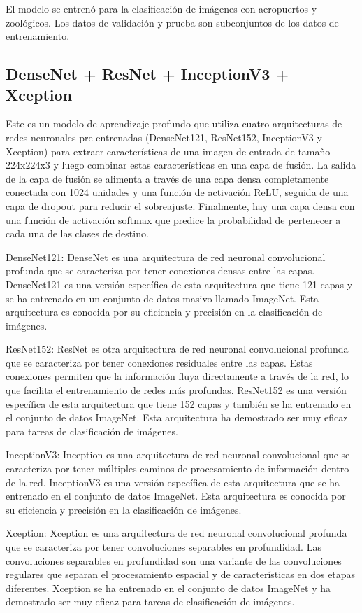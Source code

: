 \documentclass[article]{llncs}
\begin{document}
El modelo se entren\'o para la clasificación de im\'agenes con aeropuertos y zool\'ogicos. Los datos de validaci\'on y prueba 
son subconjuntos de los datos de entrenamiento.


\subsection{DenseNet + ResNet + InceptionV3 + Xception}

Este es un modelo de aprendizaje profundo que utiliza cuatro arquitecturas de redes neuronales pre-entrenadas 
(DenseNet121, ResNet152, InceptionV3 y Xception) para extraer características de una imagen de entrada de tamaño 
224x224x3 y luego combinar estas características en una capa de fusión. La salida de la capa de fusión se alimenta a 
través de una capa densa completamente conectada con 1024 unidades y una función de activación ReLU, seguida de una capa 
de dropout para reducir el sobreajuste. Finalmente, hay una capa densa con una función de activación softmax que predice 
la probabilidad de pertenecer a cada una de las clases de destino.

DenseNet121: DenseNet es una arquitectura de red neuronal convolucional profunda que se caracteriza por tener conexiones 
densas entre las capas. DenseNet121 es una versión específica de esta arquitectura que tiene 121 capas y se ha entrenado 
en un conjunto de datos masivo llamado ImageNet. Esta arquitectura es conocida por su eficiencia y precisión en la 
clasificación de imágenes.

ResNet152: ResNet es otra arquitectura de red neuronal convolucional profunda que se caracteriza por tener conexiones 
residuales entre las capas. Estas conexiones permiten que la información fluya directamente a través de la red, lo que 
facilita el entrenamiento de redes más profundas. ResNet152 es una versión específica de esta arquitectura que tiene 152 
capas y también se ha entrenado en el conjunto de datos ImageNet. Esta arquitectura ha demostrado ser muy eficaz para 
tareas de clasificación de imágenes.

InceptionV3: Inception es una arquitectura de red neuronal convolucional que se caracteriza por tener múltiples caminos 
de procesamiento de información dentro de la red. InceptionV3 es una versión específica de esta arquitectura que se ha 
entrenado en el conjunto de datos ImageNet. Esta arquitectura es conocida por su eficiencia y precisión en la 
clasificación de imágenes.

Xception: Xception es una arquitectura de red neuronal convolucional profunda que se caracteriza por tener convoluciones 
separables en profundidad. Las convoluciones separables en profundidad son una variante de las convoluciones regulares 
que separan el procesamiento espacial y de características en dos etapas diferentes. Xception se ha entrenado en el 
conjunto de datos ImageNet y ha demostrado ser muy eficaz para tareas de clasificación de imágenes.
\end{document}
